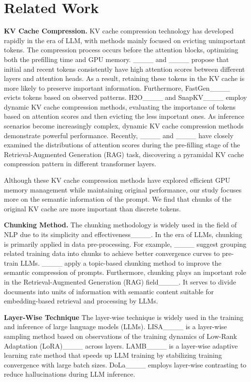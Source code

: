 \section{Related Work}
\textbf{KV Cache Compression.} KV cache compression technology has developed rapidly in the era of LLM, with methods mainly focused on evicting unimportant tokens. The compression process occurs before the attention blocks, optimizing both the prefilling time and GPU memory. ____ and ____ propose that initial and recent tokens consistently have high attention scores between different layers and attention heads. As a result, retaining these tokens in the KV cache is more likely to preserve important information. Furthermore, FastGen____ evicts tokens based on observed patterns. H2O____ and SnapKV____ employ dynamic KV cache compression methods, evaluating the importance of tokens based on attention scores and then evicting the less important ones. As inference scenarios become increasingly complex, dynamic KV cache compression methods demonstrate powerful performance. Recently, ____ and ____ have closely examined the distributions of attention scores during the pre-filling stage of the Retrieval-Augmented Generation (RAG) task, discovering a pyramidal KV cache compression pattern in different transformer layers. 

Although these KV cache compression methods have explored efficient GPU memory management while maintaining original performance, our study focuses more on the semantic information of the prompt. We find that chunks of the original KV cache are more important than discrete tokens.
   
\textbf{Chunking Method.} 
The chunking methodology is widely used in the field of NLP due to its simplicity and effectiveness____. In the era of LLMs, chunking is primarily applied in data pre-processing. For example, ____ suggest grouping related training data into chunks to achieve better convergence curves to pre-train LLMs. ____ apply a topic-based chunking method to improve the semantic compression of prompts. Furthermore, chunking plays an important role in the Retrieval-Augmented Generation (RAG) field____. It serves to divide documents into units of information with semantic content suitable for embedding-based retrieval and processing by LLMs.

\textbf{Layer-Wise Technique}
The layer-wise technique is widely used in the training and inference of large language models (LLMs). LISA____ is a layer-wise sampling method based on observations of the training dynamics of Low-Rank Adaptation (LoRA)____ across layers. LAMB____ is a layer-wise adaptive learning rate method that speeds up LLM training by stabilizing training convergence with large batch sizes. DoLa____ employs layer-wise contrasting to reduce hallucinations during LLM inference.